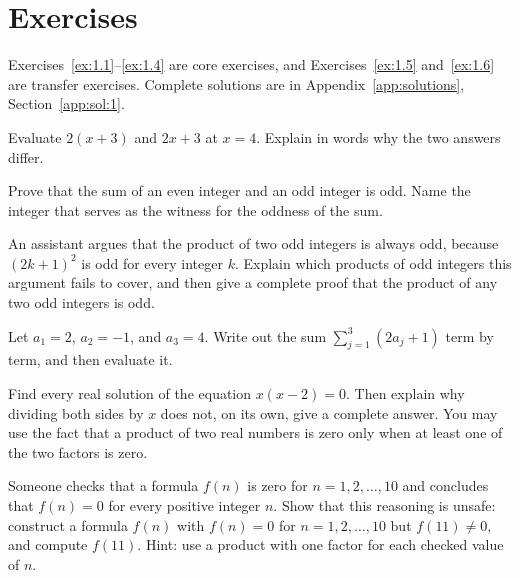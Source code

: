 \section*{Exercises}
Exercises~\ref{ex:1.1}--\ref{ex:1.4} are core exercises, and Exercises~\ref{ex:1.5} and~\ref{ex:1.6} are transfer exercises. Complete solutions are in Appendix~\ref{app:solutions}, Section~\ref{app:sol:1}.
\begin{exercise}\label{ex:1.1}Evaluate $2(x+3)$ and $2x+3$ at $x=4$. Explain in words why the two answers differ.\end{exercise}
\begin{exercise}\label{ex:1.2}Prove that the sum of an even integer and an odd integer is odd. Name the integer that serves as the witness for the oddness of the sum.\end{exercise}
\begin{exercise}\label{ex:1.3}An assistant argues that the product of two odd integers is always odd, because $(2k+1)^2$ is odd for every integer $k$. Explain which products of odd integers this argument fails to cover, and then give a complete proof that the product of any two odd integers is odd.\end{exercise}
\begin{exercise}\label{ex:1.4}Let $a_1=2$, $a_2=-1$, and $a_3=4$. Write out the sum $\sum_{j=1}^3(2a_j+1)$ term by term, and then evaluate it.\end{exercise}
\begin{exercise}\label{ex:1.5}Find every real solution of the equation $x(x-2)=0$. Then explain why dividing both sides by $x$ does not, on its own, give a complete answer. You may use the fact that a product of two real numbers is zero only when at least one of the two factors is zero.\end{exercise}
\begin{exercise}\label{ex:1.6}Someone checks that a formula $f(n)$ is zero for $n=1,2,\ldots,10$ and concludes that $f(n)=0$ for every positive integer $n$. Show that this reasoning is unsafe: construct a formula $f(n)$ with $f(n)=0$ for $n=1,2,\ldots,10$ but $f(11)\ne0$, and compute $f(11)$. Hint: use a product with one factor for each checked value of $n$.\end{exercise}
